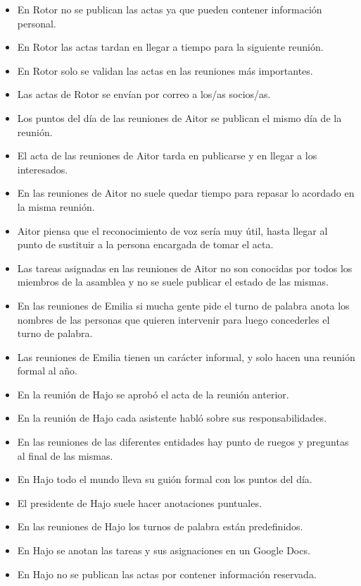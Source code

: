\documentclass{article}
\begin{document}
\begin{itemize}
\begin{itemize}
\begin{shaded}
\begin{itemize}
					\item En Rotor no se publican las actas ya que pueden contener información personal.
					\item En Rotor las actas tardan en llegar a tiempo para la siguiente reunión.
					\item En Rotor solo se validan las actas en las reuniones más importantes.
					\item Las actas de Rotor se envían por correo a los/as socios/as.
					\item Los puntos del día de las reuniones de Aitor se publican el mismo día de la reunión.
					\item El acta de las reuniones de Aitor tarda en publicarse y en llegar a los interesados.
					\item En las reuniones de Aitor no suele quedar tiempo para repasar lo acordado en la misma reunión.
					\item Aitor piensa que el reconocimiento de voz sería muy útil, hasta llegar al punto de sustituir a la persona encargada de tomar el acta.
					\item Las tareas asignadas en las reuniones de Aitor no son conocidas por todos los miembros de la asamblea y no se suele publicar el estado de las mismas.
					\item En las reuniones de Emilia si mucha gente pide el turno de palabra anota los nombres de las personas que quieren intervenir para luego concederles el turno de palabra.
					\item Las reuniones de Emilia tienen un carácter informal, y solo hacen una reunión formal al año.
					\item En la reunión de Hajo se aprobó el acta de la reunión anterior.
					\item En la reunión de Hajo cada asistente habló sobre sus responsabilidades.
					\item En las reuniones de las diferentes entidades hay punto de ruegos y preguntas al final de las mismas.
					\item En Hajo todo el mundo lleva su guión formal con los puntos del día.
					\item El presidente de Hajo suele hacer anotaciones puntuales.
					\item En las reuniones de Hajo los turnos de palabra están predefinidos.
					\item En Hajo se anotan las tareas y sus asignaciones en un Google Docs.
					\item En Hajo no se publican las actas por contener información reservada.

\end{itemize}
\end{shaded}
\end{itemize}
\end{itemize}
\end{document}
